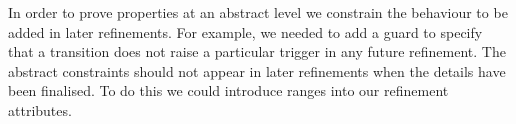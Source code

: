 In order to prove properties at an abstract level we constrain the behaviour to be added in later refinements. 
For example, we needed to add a guard to specify that a transition does not raise a particular trigger in any future refinement. 
The abstract constraints should not appear in later refinements when the details have been finalised. To do this we could introduce ranges into our refinement attributes.

